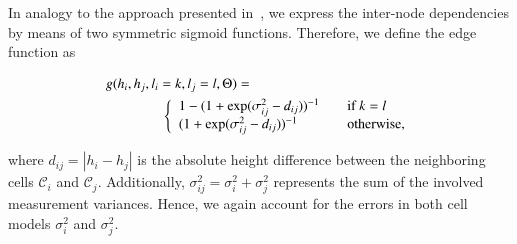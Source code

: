 In analogy to the approach presented in~\cite{siegemund10curb}, we express the
inter-node dependencies by means of two symmetric sigmoid functions. Therefore,
we define the edge function as

\begin{eqnarray}
\label{eqn:edge_function}
g(h_i,h_j,l_i=k,l_j=l,\Theta)=\phantom{aaaaaaaaaaaaaaaaaaaaaaa}\\ \nonumber
\left\{
\begin{array}{l l}
1-(1+\exp(\sigma^2_{ij}-d_{ij}))^{-1} & \quad
\text{if $k=l$}\\
(1+\exp(\sigma^2_{ij}-d_{ij}))^{-1} & \quad
\text{otherwise},
\end{array} \right.
\end{eqnarray}

where $d_{ij}=|h_i-h_j|$ is the absolute height difference between the
neighboring cells $\mathcal{C}_i$ and $\mathcal{C}_j$. Additionally,
$\sigma^2_{ij}=\sigma^2_i+\sigma^2_j$ represents the sum of the involved
measurement variances. Hence, we again account for the errors in both cell
models $\sigma^2_i$ and $\sigma^2_j$.
